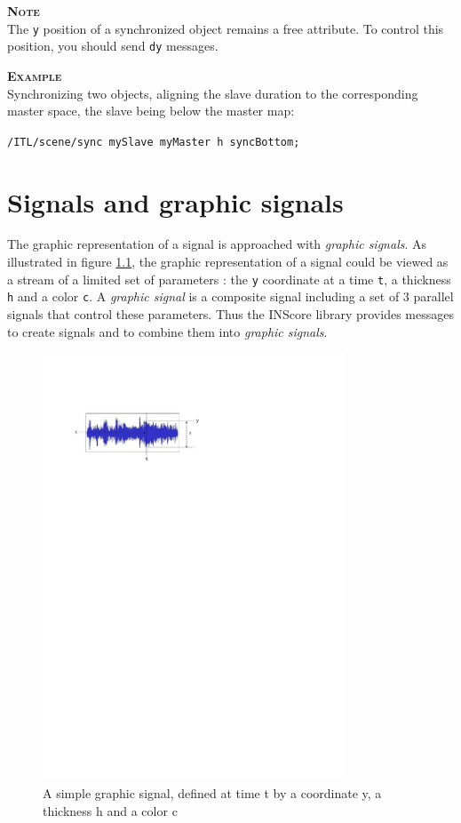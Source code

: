 \documentclass[a4paper,twoside]{report}
\newcommand{\toplevel}[1]	{\chapter{#1}}
\newcommand{\OSC}[1]		{\texttt{#1}}
\newcommand{\values}[1]		{\texttt{#1}}
\newcommand{\example}		{\textbf{\hspace{-1.5cm}\textbf{\textsc{Example }}}}
\newcommand{\note}	[1]		{\vspace{2mm}\textbf{\hspace{-0.9cm}\textbf{\textsc{Note #1}}}}
\newcommand{\sample}	[1]			{\vspace{-2mm}\begin{center}\colorbox{mygrey}{
								\begin{minipage}[t]{0.9\columnwidth} 
								{\small \texttt{#1}}
								\end{minipage}}\end{center}}
\begin{document}
\note{} \\
The \values{y} position of a synchronized object remains a free attribute. To control this position, you should send \OSC{dy} messages.  

\example \\
Synchronizing two objects, aligning the slave duration to the corresponding master space, the slave being below the master map:
\sample{/ITL/scene/sync mySlave myMaster h syncBottom;}


\toplevel{Signals and graphic signals}
\label{graphsig}

The graphic representation of a signal is approached with \emph{graphic signals}. As illustrated in figure \ref{graphimg}, the graphic representation of a signal could be viewed as a stream of a limited set of parameters : the \values{y} coordinate at a time \values{t}, a thickness \values{h} and a color \values{c}. 
A \emph{graphic signal} is a composite signal including a set of 3 parallel signals that control these parameters. Thus the INScore library provides messages to create signals and to combine them into \emph{graphic signals}. 

\begin{figure}[h]
	\centering \includegraphics[width=90mm]{imgs/graph}
 \caption{A simple graphic signal, defined at time t by a coordinate y, a thickness h and a color c}
 \label{graphimg}
\end{figure}
\end{document}
